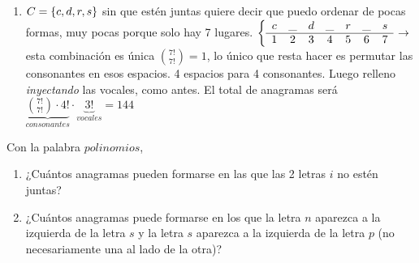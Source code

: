 \begin{enumerate}[label=\roman*)]
	\item $C = \left\{ c,d,r,s \right\}$ sin que estén juntas quiere decir que puedo ordenar de pocas formas, muy pocas porque solo hay 7 lugares.
	      $\llave{c c c c c c c c} %
		      {
			      c & \_ & d & \_ & r & \_ & s\\ \hline
			      1 & 2 & 3 & 4 & 5 & 6 & 7
		      } \to
	      $ esta combinación es única $\binom{7!}{7!} = 1$, lo único que resta hacer es permutar las consonantes en esos espacios. 4
	      espacios para 4 consonantes.
	      Luego relleno \textit{inyectando} las vocales, como antes. El total de anagramas será
	      $\underbrace{\binom{7!}{7!} \cdot 4!}_{consonantes} \cdot \underbrace{3!}_{vocales} = 144 $

\end{enumerate}

\ejercicio

Con la palabra $polinomios$,

\begin{enumerate}[label=\roman*)]
	\item ¿Cuántos anagramas pueden formarse en las que las 2 letras $i$ no estén juntas?
	\item ¿Cuántos anagramas puede formarse en los que la letra $n$ aparezca a la izquierda de la letra $s$ y
	      la letra $s$ aparezca a la izquierda de la letra $p$ (no necesariamente una al lado de la otra)?
\end{enumerate}

\separadorCorto

